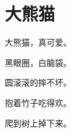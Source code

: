 \documentclass[12pt,UTF-8,openany]{ctexbook}
\begin{document}
\begin{center}
    
\end{center}


\hanzibox{}\hanzibox{}\hanzibox{}\hanzibox{}\hspace{1em}\hanzibox{}\hanzibox{}\hanzibox{}\hanzibox{}

\hanzibox{}\hanzibox{}\hanzibox{}\hanzibox{}\hspace{1em}\hanzibox{}\hanzibox{}\hanzibox{}\hanzibox{}

\hanzibox{}\hanzibox{}\hanzibox{}\hanzibox{}\hspace{1em}\hanzibox{}\hanzibox{}\hanzibox{}\hanzibox{}






\chapter{大熊猫}

\begin{large}
    
    大熊猫，真可爱。
    
    黑眼圈，白脑袋。
    
    圆滚滚的摔不坏。
    
    抱着竹子吃得欢。
    
    爬到树上掉下来。
    
\end{large}


\clearpage

\begin{center}
    
    
    
\end{center}


\hanzibox{}\hanzibox{}\hanzibox{}\hanzibox{}\hspace{1em}\hanzibox{}\hanzibox{}\hanzibox{}\hanzibox{}

\hanzibox{}\hanzibox{}\hanzibox{}\hanzibox{}\hspace{1em}\hanzibox{}\hanzibox{}\hanzibox{}\hanzibox{}
\end{document}
